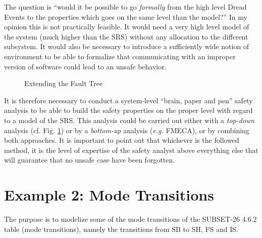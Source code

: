 \documentclass{template/openetcs_article}
\begin{document}
The question is ``would it be possible to go \emph{formally} from the high level Dread Events to 
the properties which goes on the same level than the model?'' In my opinion this is not practically 
feasible. It would need a very high level model of the system (much higher than the SRS) without any 
allocation to the different subsystem. It would also be necessary to introduce a sufficiently wide 
notion of environment to be able to formalize that communicating with an improper version of software 
could lead to an unsafe behavior.

\begin{figure}
  \centering
  \caption{Extending the Fault Tree}
  \label{fig:ext_fta}
\end{figure}

It is therefore necessary to conduct a system-level ``brain, paper and pen'' safety analysis to 
be able to build the safety properties on the proper level with regard to a model of the SRS. This
analysis could be carried out either with a \emph{top-down} analysis (cf. Fig. \ref{fig:ext_fta}) or 
by a \emph{bottom-up} analysis (\emph{e.g.} FMECA), or by combining both approaches. It is important
to point out that whichever is the followed method, it is the level of expertise of the safety analyst
above everything else that will guarantee that no unsafe case have been forgotten.

\section{Example 2: Mode Transitions}
The purpose is to modelize some of the mode transitions of the SUBSET-26 4.6.2 table (mode transitions), 
namely the transitions from SB to SH, FS and IS.
\end{document}

